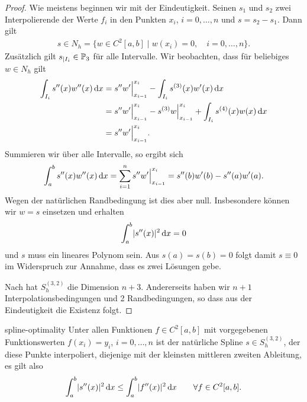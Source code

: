 \begin{proof}
  Wie meistens beginnen wir mit der Eindeutigkeit. Seinen $s_1$ und
  $s_2$ zwei Interpolierende der Werte $f_i$ in den Punkten $x_i$,
  $i=0,\dots,n$ und $s=s_2-s_1$. Dann gilt
  \begin{gather}
    \label{eq:splines:n}
    s \in N_h = \bigl\{ w\in C^2[a,b]
    \;\big|\; w(x_i) = 0, \quad i=0,\dots,n \bigr\}.
  \end{gather}
  Zusätzlich gilt $s_{| I_i}\in \P_3$ für alle Intervalle. Wir beobachten, dass für beliebiges $w\in N_h$ gilt
  \begin{align}
    \int_{I_i} s''(x) w''(x)\dx
    &= s''w'\Bigr|^{x_i}_{x_{i-1}} - \int_{I_i} s^{(3)}(x) w'(x)\dx\\
    &= s''w'\Bigr|^{x_i}_{x_{i-1}} - s^{(3)}w \Bigr|^{x_i}_{x_{i-1}}
      + \int_{I_i} s^{(4)}(x) w(x)\dx\\
    &= s''w'\Bigr|^{x_i}_{x_{i-1}}.
  \end{align}
  Summieren wir über alle Intervalle, so ergibt sich
  \begin{gather}
    \int_a^b s''(x) w''(x)\dx = \sum_{i=1}^n s''w'\Bigr|^{x_i}_{x_{i-1}}
    = s''(b) w'(b) - s''(a)w'(a).
  \end{gather}
  Wegen der natürlichen Randbedingung ist dies aber null. Insbesondere
  können wir $w=s$ einsetzen und erhalten
  \begin{gather}
    \int_a^b \abs{s''(x)}^2 \dx = 0
  \end{gather}
  und $s$ muss ein lineares Polynom sein. Aus $s(a) = s(b) = 0$ folgt
  damit $s\equiv 0$ im Widerspruch zur Annahme, dass es zwei Lösungen
  gebe.

  Nach  hat $S_h^{(3,2)}$ die Dimension
  $n+3$. Andererseits haben wir $n+1$ Interpolationsbedingungen und 2
  Randbedingungen, so dass aus der Eindeutigkeit die Existenz folgt.
\end{proof}

\begin{Lemma}{spline-optimality}
  Unter allen Funktionen $f\in C^2[a,b]$ mit vorgegebenen
  Funktionswerten $f(x_i) = y_i$, $i=0,\dots,n$ ist der natürliche
  Spline $s\in S_h^{(3,2)}$, der diese Punkte interpoliert, diejenige
  mit der kleinsten mittleren zweiten Ableitung, es gilt also
  \begin{gather}
    \int_a^b \abs{s''(x)}^2\dx \le \int_a^b \abs{f''(x)}^2 \dx
    \qquad \forall f\in C^2[a,b].
  \end{gather}
\end{Lemma}

